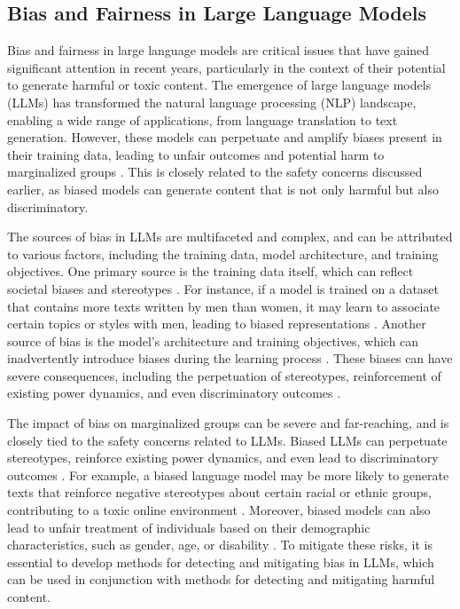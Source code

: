 \documentclass[11pt]{article}
\begin{document}
\subsection{Bias and Fairness in Large Language Models}

Bias and fairness in large language models are critical issues that have gained significant attention in recent years, particularly in the context of their potential to generate harmful or toxic content. The emergence of large language models (LLMs) \cite{ref32} has transformed the natural language processing (NLP) landscape, enabling a wide range of applications, from language translation to text generation. However, these models can perpetuate and amplify biases present in their training data, leading to unfair outcomes and potential harm to marginalized groups \cite{ref308}. This is closely related to the safety concerns discussed earlier, as biased models can generate content that is not only harmful but also discriminatory.

The sources of bias in LLMs are multifaceted and complex, and can be attributed to various factors, including the training data, model architecture, and training objectives. One primary source is the training data itself, which can reflect societal biases and stereotypes \cite{ref309}. For instance, if a model is trained on a dataset that contains more texts written by men than women, it may learn to associate certain topics or styles with men, leading to biased representations \cite{ref310}. Another source of bias is the model's architecture and training objectives, which can inadvertently introduce biases during the learning process \cite{ref311}. These biases can have severe consequences, including the perpetuation of stereotypes, reinforcement of existing power dynamics, and even discriminatory outcomes \cite{ref312}.

The impact of bias on marginalized groups can be severe and far-reaching, and is closely tied to the safety concerns related to LLMs. Biased LLMs can perpetuate stereotypes, reinforce existing power dynamics, and even lead to discriminatory outcomes \cite{ref312}. For example, a biased language model may be more likely to generate texts that reinforce negative stereotypes about certain racial or ethnic groups, contributing to a toxic online environment \cite{ref313}. Moreover, biased models can also lead to unfair treatment of individuals based on their demographic characteristics, such as gender, age, or disability \cite{ref314}. To mitigate these risks, it is essential to develop methods for detecting and mitigating bias in LLMs, which can be used in conjunction with methods for detecting and mitigating harmful content.
\end{document}
